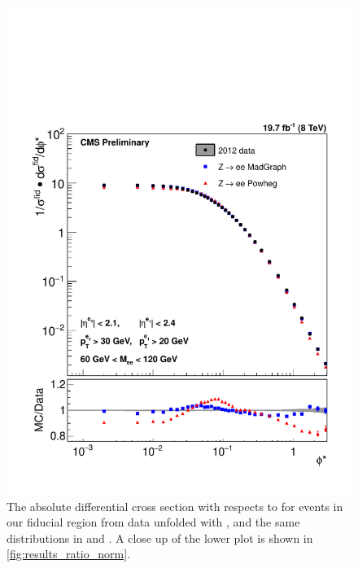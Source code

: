 \begin{figure}[!p]
    \centering
    \includegraphics[width=\textwidth]{figures/ZShape_elec_Norm_Dressed.pdf}
    \caption[
        The absolute differential cross section with respects to \phistar for
        \Ztoee events in our fiducial region from data unfolded with \MADGRAPH,
        and the same distributions in \MADGRAPH and \POWHEG.
    ]{
        The absolute differential cross section with respects to \phistar for
        \Ztoee events in our fiducial region from data unfolded with \MADGRAPH,
        and the same distributions in \MADGRAPH and \POWHEG. A close up of the
        lower plot is shown in \cref{fig:results_ratio_norm}.
    }
    \label{fig:results_norm}
\end{figure}

